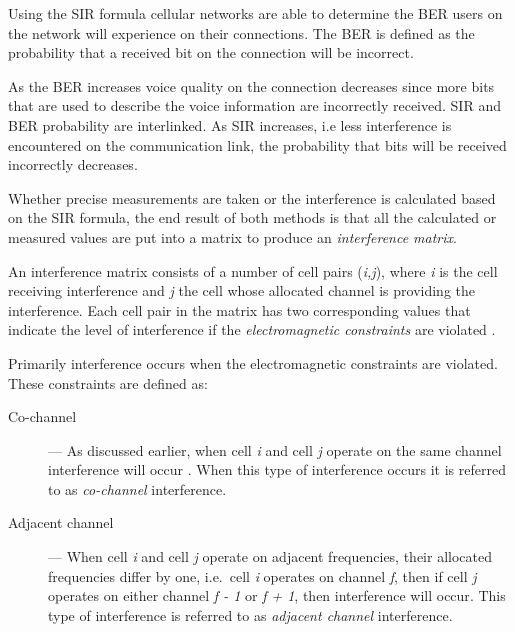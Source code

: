 Using the \gls{SIR} formula cellular networks are able to determine the \gls{BER} users on the network will experience on their connections\cite{WirelessDigitalCommunications}. The \gls{BER} is defined as the probability that a received bit on the connection will be incorrect\cite{MobileWirelessCommunications}. 

As the \gls{BER} increases voice quality on the connection decreases since more bits that are used to describe the voice information are incorrectly received\cite{WirelessDigitalCommunications}. \gls{SIR} and \gls{BER} probability are interlinked. As \gls{SIR} increases, i.e less interference is encountered on the communication link, the probability that bits will be received incorrectly decreases\cite{WirelessDigitalCommunications}.

Whether precise measurements are taken or the interference is calculated based on the \gls{SIR} formula, the end result of both methods is that all the calculated or measured values are put into a matrix to produce an \emph{interference matrix}\cite{ACOvsEA}.

An interference matrix consists of a number of cell pairs (\emph{i,j}), where \emph{i} is the cell receiving interference and \emph{j} the cell whose allocated channel is providing the interference\cite{Karen2004}. Each cell pair in the matrix has two corresponding values that indicate the level of interference if the \emph{electromagnetic constraints} are violated \cite{ACOvsEA,AndreasPaper}. 

Primarily interference occurs when the electromagnetic constraints are violated. These constraints are defined as:
\begin{description}
\item[Co-channel] --- As discussed earlier, when cell \emph{i} and cell \emph{j} operate on the same channel interference will occur \cite{GSMSysEngin,PrinciplesMobileCommunication}. When this type of interference occurs it is referred to as \emph{co-channel} interference.
\item[Adjacent channel] --- When cell \emph{i} and cell \emph{j} operate on adjacent frequencies, their allocated frequencies differ by one, i.e.\ cell \emph{i} operates on channel \emph{f}, then if cell \emph{j} operates on either channel \emph{f - 1} or \emph{f + 1}, then interference will occur\cite{GSMSysEngin,InterferenceOrientatedFAP}. This type of interference is referred to as \emph{adjacent channel} interference.
\end{description}

